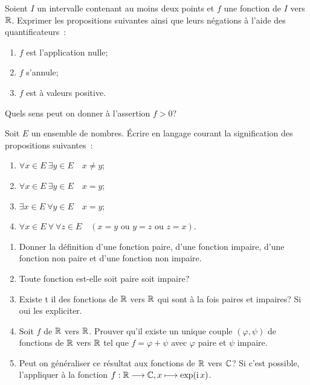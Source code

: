 \begin{exercice}
  Soient \(I\) un intervalle contenant au moins deux points et \(f\) une 
  fonction de \(I\) vers \(\mathbb{R}\). Exprimer les propositions suivantes ainsi que 
  leurs négations à l'aide des quantificateurs~:
  \begin{enumerate}
    \item \(f\) est l'application nulle;
    \item \(f\) s'annule;
    \item \(f\) est à valeurs positive.
  \end{enumerate}
  Quels sens peut on donner à l'assertion \(f>0\)?
\end{exercice}

\begin{exercice}
  Soit \(E\) un ensemble de nombres. Écrire en langage courant la signification 
  des propositions suivantes~:
  \begin{enumerate}
    \item \(\forall x \in E \ \exists y \in E \quad x \neq y\);
    \item \(\forall x \in E \ \exists y \in E \quad x = y\);
    \item \(\exists x \in E \ \forall y \in E \quad x = y\);
    \item \(\forall x \in E \ \forall \ \forall z \in E \quad (x=y \textrm{~ou~}
      y=z \textrm{~ou~} z=x)\).
  \end{enumerate}
\end{exercice}

\begin{exercice}
  \begin{enumerate}
    \item Donner la définition d'une fonction paire, d'une fonction impaire,
      d'une fonction non paire et d'une fonction non impaire.
    \item Toute fonction est-elle soit paire soit impaire?
    \item Existe t il des fonctions de \(\mathbb{R}\) vers \(\mathbb{R}\) qui sont à la fois
      paires  et impaires? Si oui les expliciter.
    \item Soit \(f\) de \(\mathbb{R}\) vers \(\mathbb{R}\). Prouver qu'il existe un unique
      couple \((\varphi, \psi)\) de fonctions de \(\mathbb{R}\) vers \(\mathbb{R}\) tel que
      \(f=\varphi+\psi\) avec \(\varphi\) paire et \(\psi\) impaire.
    \item Peut on généraliser ce résultat aux fonctions de \(\mathbb{R}\) vers \(\mathbb{C}\)?
      Si c'est possible, l'appliquer à la fonction
      \(f:\mathbb{R} \longrightarrow \mathbb{C}, x \longmapsto \exp(\operatorname{i} x)\).
  \end{enumerate}
\end{exercice}

